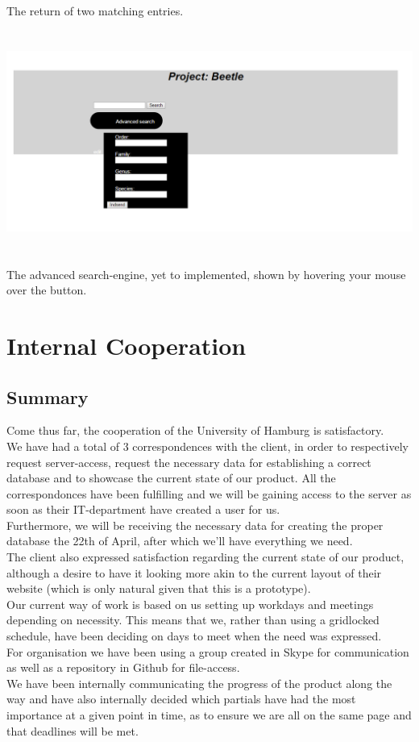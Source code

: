 \documentclass[12pt,a4paper]{article}
\begin{document}
The return of two matching entries.\\
\includegraphics[height=80mm]{Prototype5.png}\\
The advanced search-engine, yet to implemented, shown by hovering your mouse over the button.\\

\newpage

\section{Internal Cooperation}
\subsection{Summary}

Come thus far, the cooperation of the University of Hamburg is satisfactory.\\
We have had a total of 3 correspondences with the client, in order to respectively request server-access, request the necessary data for establishing a correct database and to showcase the current state of our product.
All the correspondonces have been fulfilling and we will be gaining access to the server as soon as their IT-department have created a user for us.\\ Furthermore, we will be receiving the necessary data for creating the proper database the 22th of April, after which we'll have everything we need. \\
The client also expressed satisfaction regarding the current state of our product, although a desire to have it looking more akin to the current layout of their website (which is only natural given that this is a prototype).\\
Our current way of work is based on us setting up workdays and meetings depending on necessity. This means that we, rather than using a gridlocked schedule, have been deciding on days to meet when the need was expressed.\\
For organisation we have been using a group created in Skype for communication as well as a repository in Github for file-access. \\
We have been internally communicating the progress of the product along the way and have also internally decided which partials have had the most importance at a given point in time, as to ensure we are all on the same page and that deadlines will be met.\\
\end{document}
